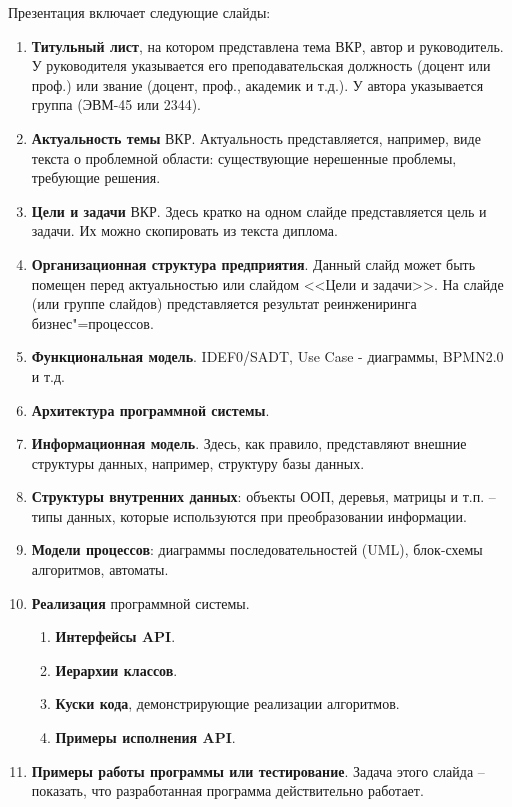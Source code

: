 \documentclass[a4paper,14pt,final]{extreport}
\begin{document}
Презентация включает следующие слайды:
\begin{enumerate}
\item \textbf{Титульный лист}, на котором представлена тема ВКР, автор и руководитель.  У руководителя указывается его преподавательская должность (доцент или проф.) или звание (доцент, проф., академик и т.д.).  У автора указывается группа (ЭВМ-45 или 2344).
\item \textbf{Актуальность темы} ВКР.  Актуальность представляется, например,  виде текста о проблемной области: существующие нерешенные проблемы, требующие решения.
\item \textbf{Цели и задачи} ВКР.  Здесь кратко на одном слайде представляется цель и задачи.  Их можно скопировать из текста диплома.
\item \textbf{Организационная структура предприятия}.  Данный слайд может быть помещен перед актуальностью или слайдом <<Цели и задачи>>.  На слайде (или группе слайдов) представляется результат реинжениринга бизнес"=процессов.
\item \textbf{Функциональная модель}. IDEF0/SADT, Use Case - диаграммы, BPMN2.0 и т.д.
\item \textbf{Архитектура программной системы}.
\item \textbf{Информационная модель}.  Здесь, как правило, представляют внешние структуры данных, например, структуру базы данных.
\item \textbf{Структуры внутренних данных}: объекты ООП, деревья, матрицы и т.п. -- типы данных, которые используются при преобразовании информации.
\item \textbf{Модели процессов}: диаграммы последовательностей (UML), блок-схемы алгоритмов, автоматы.
\item \textbf{Реализация} программной системы.
  \begin{enumerate}
  \item \textbf{Интерфейсы API}.
  \item \textbf{Иерархии классов}.
  \item \textbf{Куски кода}, демонстрирующие реализации алгоритмов.
  \item \textbf{Примеры исполнения API}.
  \end{enumerate}
\item \textbf{Примеры работы программы или тестирование}.  Задача этого слайда -- показать, что разработанная программа действительно работает.

\end{enumerate}
\end{document}
